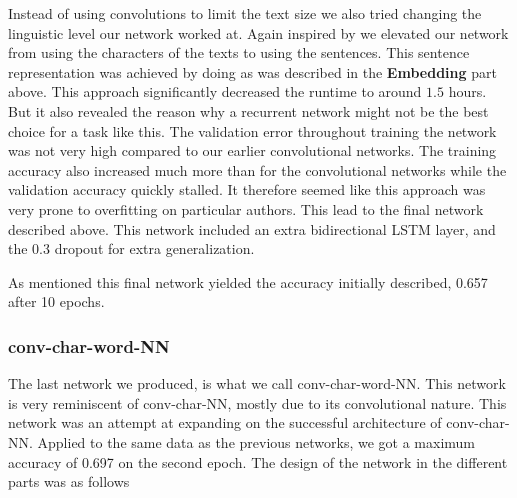 Instead of using convolutions to limit the text size we also tried changing
the linguistic level our network worked at. Again inspired by \cite{qian:2018}
we elevated our network from using the characters of the texts to using the
sentences. This sentence representation was achieved by doing as was described
in the \textbf{Embedding} part above. This approach significantly decreased
the runtime to around $1.5$ hours. But it also revealed the reason why a
recurrent network might not be the best choice for a task like this. The
validation error throughout training the network was not very high compared to
our earlier convolutional networks. The training accuracy also increased much
more than for the convolutional networks while the validation accuracy quickly
stalled. It therefore seemed like this approach was very prone to overfitting on
particular authors. This lead to the final network described above. This network
included an extra bidirectional \gls{LSTM} layer, and the 0.3 dropout for extra
generalization.

As mentioned this final network yielded the accuracy initially described,
0.657 after 10 epochs. 


\subsubsection{\glsdesc{conv-char-word-NN}}
\label{subsubsec:conv_char_word_nn}

The last network we produced, is what we call \gls{conv-char-word-NN}.
This network is very reminiscent of \gls{conv-char-NN}, mostly due to
its convolutional nature. This network was an attempt at expanding
on the successful architecture of \gls{conv-char-NN}. Applied to the 
same data as the previous networks, we got a maximum accuracy of 0.697
on the second epoch. The design of the network in the different parts was
as follows

